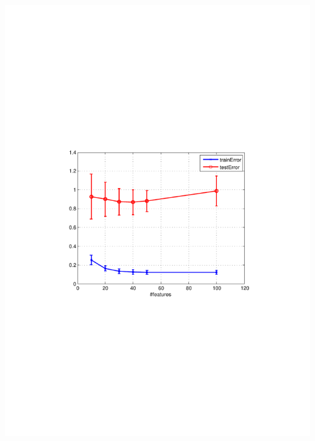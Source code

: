 \begin{minipage}{\textwidth}
\begin{minipage}[b]{0.45\textwidth}
    \includegraphics[clip, trim=4cm 9.2cm 3.5cm 9cm, width=\textwidth]{figures/ALS_features.pdf}
    \label{fig:ALS_features}
    \end{minipage}
  \end{minipage}
  
